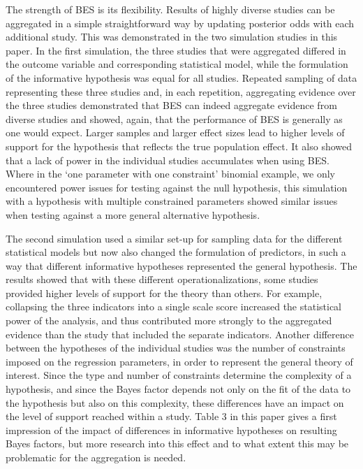 \documentclass[11pt,reqno]{article}
\begin{document}
The strength of BES is its flexibility. Results of highly diverse studies can be aggregated in a simple straightforward way by updating posterior odds with each additional study. This was demonstrated in the two simulation studies in this paper. In the first simulation, the three studies that were aggregated differed in the outcome variable and corresponding statistical model, while the formulation of the informative hypothesis was equal for all studies. Repeated sampling of data representing these three studies and, in each repetition, aggregating evidence over the three studies demonstrated that BES can indeed aggregate evidence from diverse studies and showed, again, that the performance of BES is generally as one would expect. Larger samples and larger effect sizes lead to higher levels of support for the hypothesis that reflects the true population effect. It also showed that a lack of power in the individual studies accumulates when using BES. Where in the `one parameter with one constraint' binomial example, we only encountered power issues for testing against the null hypothesis, this simulation with a hypothesis with multiple constrained parameters showed similar issues when testing against a more general alternative hypothesis.

The second simulation used a similar set-up for sampling data for the different statistical models but now also changed the formulation of predictors, in such a way that different informative hypotheses represented the general hypothesis. The results showed that with these different operationalizations, some studies provided higher levels of support for the theory than others. For example, collapsing the three indicators into a single scale score increased the statistical power of the analysis, and thus contributed more strongly to the aggregated evidence than the study that included the separate indicators. Another difference between the hypotheses of the individual studies was the number of constraints imposed on the regression parameters, in order to represent the general theory of interest. Since the type and number of constraints determine the complexity of a hypothesis, and since the Bayes factor depends not only on the fit of the data to the hypothesis but also on this complexity, these differences have an impact on the level of support reached within a study. Table 3 in this paper gives a first impression of the impact of differences in informative hypotheses on resulting Bayes factors, but more research into this effect and to what extent this may be problematic for the aggregation is needed.
\end{document}
